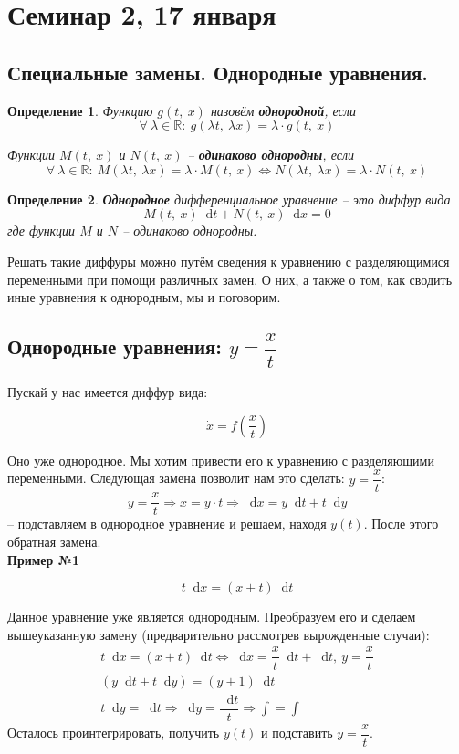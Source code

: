\documentclass[a4paper,12pt]{article}
\newtheorem{definition}{Определение}
\newcommand{\R}{\mathbb{R}}
\renewcommand*\d{\mathop{}\!\mathrm{d}}
\newcommand{\dx}{\dot{x}}
\newcommand{\ds}{\displaystyle}
\begin{document}
\newpage
\section{Семинар 2, 17 января}

\subsection{Специальные замены. Однородные уравнения.}

\begin{definition}
	Функцию $g(t,\ x)$ назовём \textbf{однородной}, если
	\[\forall\ \lambda \in \R:\ g(\lambda t,\ \lambda x) = \lambda \cdot g(t,\ x)\]
	
	Функции $M(t,\ x)$ и $N(t,\ x)$ -- \textbf{одинаково однородны}, если 
	\[\forall\ \lambda \in \R:\ M(\lambda t,\ \lambda x) = \lambda \cdot M(t,\ x) \iff N(\lambda t,\ \lambda x) = \lambda \cdot N(t,\ x)\]
\end{definition}
\begin{definition}
	\textbf{Однородное} дифференциальное уравнение -- это диффур вида
	\[M(t,\ x) \d t + N(t,\ x)\d x = 0\] где функции $M$ и $N$ -- одинаково однородны.
\end{definition}

Решать такие диффуры можно путём сведения к уравнению с разделяющимися переменными при помощи различных замен. О них, а также о том, как сводить иные уравнения к однородным, мы и поговорим.

\subsection{Однородные уравнения: $y = \dfrac{x}{t}$}

Пускай у нас имеется диффур вида:

\[\dx = f\left(\dfrac{x}{t}\right)\]

Оно уже однородное. Мы хотим привести его к уравнению с разделяющими переменными. Следующая замена позволит нам это сделать: $y = \dfrac{x}{t}$:
\[y = \dfrac{x}{t} \Longrightarrow x = y\cdot t \Longrightarrow \d x = y\d t + t \d y\] -- подставляем в однородное уравнение и решаем, находя $y(t)$. После этого обратная замена.
\ \\

\textbf{Пример №1}

\[t \d x = (x + t) \d t\]

Данное уравнение уже является однородным. Преобразуем его и сделаем вышеуказанную замену (предварительно рассмотрев вырожденные случаи):
\begin{gather*}
	t \d x = (x + t) \d t \iff \d x = \dfrac{x}{t}\d t + \d t,\ y = \dfrac{x}{t}\\
	(y\d t + t \d y) = (y + 1)\d t\\
	t\d y = \d t \Longrightarrow \d y = \dfrac{\d t}{t} \Longrightarrow \ds\int=\int
\end{gather*}
Осталось проинтегрировать, получить $y(t)$ и подставить $y = \dfrac{x}{t}$.
\ \\
\end{document}
